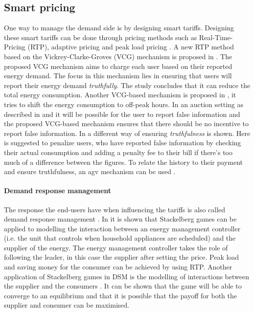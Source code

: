 \subsection{Smart pricing}
One way to manage the demand side is by designing smart tariffs. Designing these smart tariffs can be done through pricing methods such as Real-Time-Pricing (RTP), adaptive pricing and peak load pricing \cite{SamadiMohsenian-RadSchoberEtAl2012}. A new RTP method based on the Vickrey-Clarke-Groves (VCG) mechanism is proposed in \cite{SamadiMohsenian-RadSchoberEtAl2012}. The proposed VCG mechanism aims to charge each user based on their reported energy demand. The focus in this mechanism lies in ensuring that users will report their energy demand \emph{truthfully}. The study concludes that it can reduce the total energy consumption. Another VCG-based mechanism is proposed in \cite{SamadiSchoberWong2011}, it tries to shift the energy consumption to off-peak hours. In an auction setting as described in \cite{SamadiMohsenian-RadSchoberEtAl2012} and \cite{SamadiSchoberWong2011} it will be possible for the user to report false information and the proposed VCG-based mechanism ensures that there should be no incentive to report false information. In \cite{MaDengSongEtAl2014} a different way of ensuring \emph{truthfulness} is shown. Here is suggested to penalize users, who have  reported false information by checking their actual consumption and adding a penalty fee to their bill if there's too much of a difference between the figures. To relate the history to their payment and ensure truthfulness, an \ac{agv} mechanism can be used \cite{MaDengSongEtAl2014}.

\paragraph{Demand response management}
The response the end-users have when influencing the tariffs is also called demand response management \cite{MaharjanZhuZhangEtAl2013}.
In \cite{ChenKishoreSnyder2011} it is shown that Stackelberg games can be applied to modelling the interaction between an energy management controller (i.e. the unit that controls when household appliances are scheduled) and the supplier of the energy. The energy management controller takes the role of following the leader, in this case the supplier after setting the price. Peak load and saving money for the consumer can be achieved by using RTP. Another application of Stackelberg games in DSM is the modelling of interactions between the supplier and the consumers \cite{MaharjanZhuZhangEtAl2013}. It can be shown that the game will be able to converge to an equilibrium and that it is possible that the payoff for both the supplier and consumer can be maximised. 

